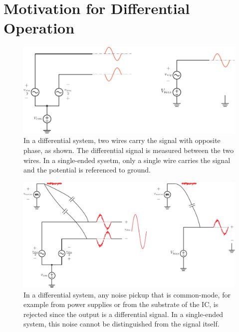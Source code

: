 \section{Motivation for Differential Operation}
\begin{figure}[tb]
\begin{center}
\includegraphics[width=0.75\columnwidth]{diff_vs_cm.pdf} 
\end{center}
\caption{In a differential system, two wires carry the signal with opposite phase, as shown.  The differential signal is measured between the two wires.  In a single-ended sysetm, only a single wire carries the signal and the potential is referenced to ground. }
\label{fig:diffckt}
\end{figure}
\begin{figure}[tb]
\begin{center}
\includegraphics[width=0.85\columnwidth]{diff_cm_noise.pdf} 
\end{center}
\caption{In a differential system, any noise pickup that is common-mode, for example from power supplies or from the substrate of the IC, is rejected since the output is a differential signal.  In a single-ended system, this noise cannot be distinguished from the signal itself.}
\label{fig:noisereject}
\end{figure}
